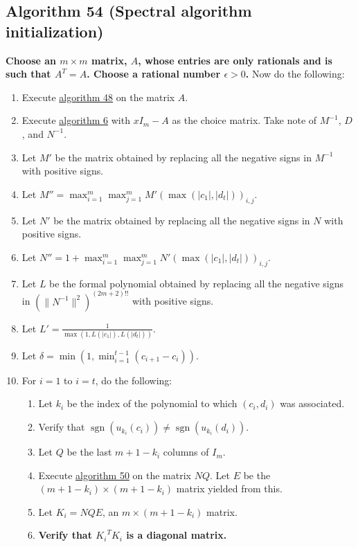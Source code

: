 \documentclass[twocolumn]{article}
\DeclareMathOperator{\sgn}{sgn}
\begin{document}
		\subsection{Algorithm 54 (Spectral algorithm initialization)}\label{sec:algorithm 54}
			\textbf{Choose an $m\times m$ matrix, $A$, whose entries are only rationals and is such that $A^T=A$. Choose a rational number $\epsilon>0$.} Now do the following:
			\begin{enumerate}
				\item Execute \hyperref[sec:algorithm 48]{algorithm 48} on the matrix $A$.
				\item Execute \hyperref[sec:algorithm 6]{algorithm 6} with $xI_m-A$ as the choice matrix. Take note of $M^{-1}$, $D$, and $N^{-1}$.
				\item Let $M'$ be the matrix obtained by replacing all the negative signs in $M^{-1}$ with positive signs.
				\item Let $M''=\max_{i=1}^m\max_{j=1}^mM'(\max(\lvert c_1\rvert,\lvert d_t\rvert))_{i,j}$.
				\item Let $N'$ be the matrix obtained by replacing all the negative signs in $N$ with positive signs.
				\item Let $N''=1+\max_{i=1}^m\max_{j=1}^mN'(\max(\lvert c_1\rvert,\lvert d_t\rvert))_{i,j}$.
				\item Let $L$ be the formal polynomial obtained by replacing all the negative signs in $(\lVert N^{-1}\rVert^2)^{(2m+2)!!}$ with positive signs.
				\item Let $L'=\frac{1}{\max(1,L(\lvert c_1\rvert),L(\lvert d_t\rvert))}$.
				\item Let $\delta=\min(1,\min_{i=1}^{t-1}(c_{i+1}-c_i))$.
				\item For $i=1$ to $i=t$, do the following:
				\begin{enumerate}
					\item Let $k_i$ be the index of the polynomial to which $(c_i, d_i)$ was associated.
					\item Verify that $\sgn(u_{k_i}(c_i))\ne\sgn(u_{k_i}(d_i))$.
					\item Let $Q$ be the last $m+1-k_i$ columns of $I_m$.
					\item Execute \hyperref[sec:algorithm 50]{algorithm 50} on the matrix $NQ$. Let $E$ be the $(m+1-k_i)\times (m+1-k_i)$ matrix yielded from this.
					\item Let $K_i=NQE$, an $m\times(m+1-k_i)$ matrix.
					\item \textbf{Verify that ${K_i}^T{K_i}$ is a diagonal matrix.}

\end{enumerate}
\end{enumerate}
\end{document}
